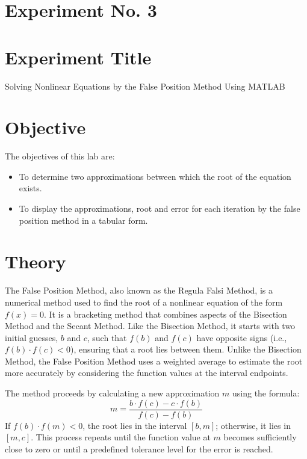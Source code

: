 \documentclass[a4paper,12pt]{article}
\begin{document}
	\section{Experiment No. 3}
	
	\section{Experiment Title }
Solving Nonlinear Equations by the False Position Method Using MATLAB
	\section{Objective}
	
	The objectives of this lab are:
	\begin{itemize}
		\item To determine two approximations between which the root of the equation exists.
		\item To display the approximations, root and error for each iteration by the false position method in a
		tabular form.
		
	\end{itemize}
	\section{Theory}
	
	
	The False Position Method, also known as the Regula Falsi Method, is a numerical method used to find the root of a nonlinear equation of the form $f(x) = 0$. It is a bracketing method that combines aspects of the Bisection Method and the Secant Method. Like the Bisection Method, it starts with two initial guesses, $b$ and $c$, such that $f(b)$ and $f(c)$ have opposite signs (i.e., $f(b) \cdot f(c) < 0$), ensuring that a root lies between them. Unlike the Bisection Method, the False Position Method uses a weighted average to estimate the root more accurately by considering the function values at the interval endpoints.
	
	The method proceeds by calculating a new approximation $m$ using the formula:
	\[
	m = \frac{b \cdot f(c) - c \cdot f(b)}{f(c) - f(b)}
	\]
	If $f(b) \cdot f(m) < 0$, the root lies in the interval $[b, m]$; otherwise, it lies in $[m, c]$. This process repeats until the function value at $m$ becomes sufficiently close to zero or until a predefined tolerance level for the error is reached.

	
\end{document}
